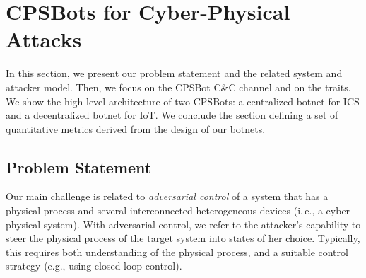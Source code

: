 \documentclass[sigconf]{acmart}
\makeatletter
\newcommand{\ie}{i.\@\,e.,\@\xspace}
\newcommand{\eg}{e.\@\,g.,\@\xspace}
\newcommand{\Botnet}{CPSBot\@\xspace}
\newcommand{\Botnets}{CPSBots\@\xspace}
\newcommand{\CC}{C\&C\@\xspace}
\makeatother
\begin{document}
\section{\Botnets for Cyber-Physical Attacks}
\label{sec:design}

In this section, we present our problem statement and the related
system and attacker model. Then, we focus on the \Botnet
\CC channel and on the traits. We show the high-level
architecture of two \Botnets: a centralized botnet for ICS and a decentralized
botnet for IoT. We conclude the section defining a set of quantitative metrics
derived from the design of our botnets.

\subsection{Problem Statement}
\label{sec:problem}



Our main challenge is related to
\emph{adversarial control} of a system that has a
physical process and several interconnected heterogeneous devices (\ie a
cyber-physical system). With adversarial control, we refer to the
attacker's capability to steer the physical process of the target
system into states of her choice. Typically, this requires both
understanding of the physical process, and a suitable control strategy
(e.g., using closed loop control). %
\end{document}
